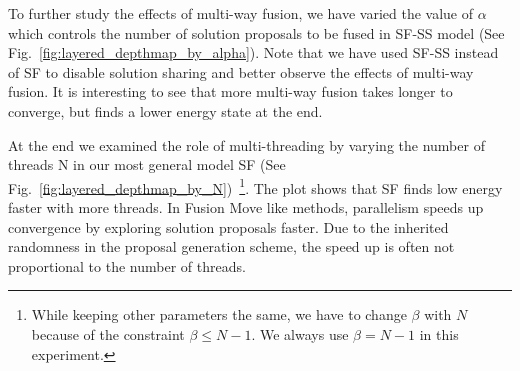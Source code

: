 %
To further study the effects of multi-way fusion, we have varied the
value of $\alpha$ which controls the number of solution proposals to be
fused in SF-SS model (See
Fig.~\ref{fig:layered_depthmap_by_alpha}). Note that we have used SF-SS
instead of SF to disable solution sharing and better observe the effects
of multi-way fusion.
It is interesting to see that more multi-way fusion takes longer to
converge, but finds a lower energy state at the end.

At the end we examined the role of multi-threading by varying the number of threads N in our most general model SF (See Fig.~\ref{fig:layered_depthmap_by_N})~\footnote{While keeping other parameters the same, we have to change $\beta$ with $N$ because of the constraint $\beta \leq N-1$. We always use $\beta = N-1$ in this experiment.}. The plot shows that SF finds low energy faster with more threads. In Fusion Move like methods, parallelism speeds up convergence by exploring solution proposals faster. Due to the inherited randomness in the proposal generation scheme, the speed up is often not proportional to the number of threads.
